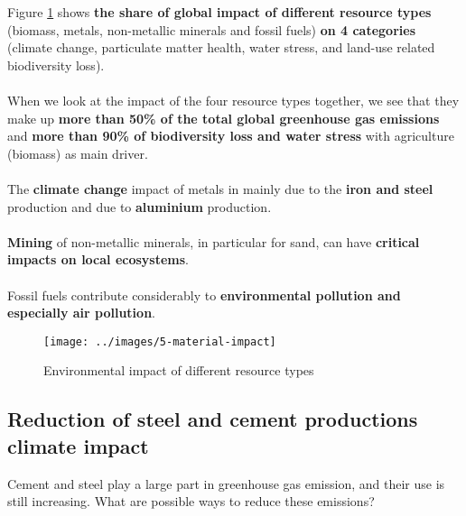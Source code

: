 \documentclass[../summary.tex]{subfiles}
\begin{document}
Figure \ref{fig:material-impact} shows \textbf{the share of global impact of different resource types} (biomass, metals, non-metallic minerals and fossil fuels) \textbf{on 4 categories} (climate change, particulate matter health, water stress, and land-use related biodiversity loss).
\\\\
When we look at the impact of the four resource types together, we see that they make up \textbf{more than 50\% of the total global greenhouse gas emissions} and \textbf{more than 90\% of biodiversity loss and water stress} with agriculture (biomass) as main driver.
\\\\
The \textbf{climate change} impact of metals in mainly due to the \textbf{iron and steel} production and due to \textbf{aluminium} production.
\\\\
\textbf{Mining} of non-metallic minerals, in particular for sand, can have \textbf{critical impacts on local ecosystems}.
\\\\
Fossil fuels contribute considerably to \textbf{environmental pollution and especially air pollution}.

\begin{figure}[H]
	\centering
	\texttt{[image: ../images/5-material-impact]}
	\caption{Environmental impact of different resource types}
	\label{fig:material-impact}
\end{figure}
\newpage

\subsection{Reduction of steel and cement productions climate impact}

Cement and steel play a large part in greenhouse gas emission, and their use is still increasing. What are possible ways to reduce these emissions?
\end{document}
